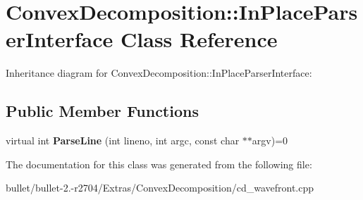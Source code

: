 \hypertarget{class_convex_decomposition_1_1_in_place_parser_interface}{\section{Convex\+Decomposition\+:\+:In\+Place\+Parser\+Interface Class Reference}
\label{class_convex_decomposition_1_1_in_place_parser_interface}
}


Inheritance diagram for Convex\+Decomposition\+:\+:In\+Place\+Parser\+Interface\+:
\subsection*{Public Member Functions}
\begin{DoxyCompactItemize}
\item 
\hypertarget{class_convex_decomposition_1_1_in_place_parser_interface_a90471863a3ff40898e62011f8fc2d4c0}{virtual int {\bfseries Parse\+Line} (int lineno, int argc, const char $\ast$$\ast$argv)=0}\label{class_convex_decomposition_1_1_in_place_parser_interface_a90471863a3ff40898e62011f8fc2d4c0}

\end{DoxyCompactItemize}


The documentation for this class was generated from the following file\+:\begin{DoxyCompactItemize}
\item 
bullet/bullet-\/2.-\/r2704/\+Extras/\+Convex\+Decomposition/cd\+\_\+wavefront.\+cpp\end{DoxyCompactItemize}
